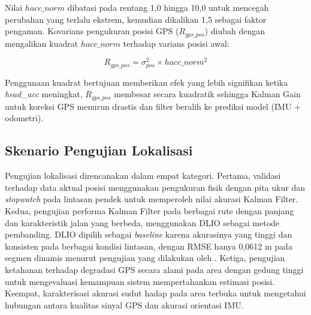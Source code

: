 Nilai $hacc\_norm$ dibatasi pada rentang 1,0 hingga 10,0 untuk mencegah perubahan yang terlalu ekstrem, kemudian dikalikan 1,5 sebagai faktor pengaman.
Kovarians pengukuran posisi GPS ($R_{gps\_pos}$) diubah dengan mengalikan kuadrat $hacc\_norm$ terhadap varians posisi awal:

\begin{equation}
R_{gps\_pos} = \sigma_{pos}^2 \times hacc\_norm^2
\label{eq:r_gps_adaptif}
\end{equation}

Penggunaan kuadrat bertujuan memberikan efek yang lebih signifikan ketika \emph{head\_acc} meningkat, $R_{gps\_pos}$ membesar secara kuadratik sehingga Kalman Gain untuk koreksi GPS menurun drastis dan filter beralih ke prediksi model (IMU + odometri).

\subsection{Skenario Pengujian Lokalisasi}

Pengujian lokalisasi direncanakan dalam empat kategori.
Pertama, validasi terhadap data aktual posisi menggunakan pengukuran fisik dengan pita ukur dan \emph{stopwatch} pada lintasan pendek untuk memperoleh nilai akurasi Kalman Filter.
Kedua, pengujian performa Kalman Filter pada berbagai rute dengan panjang dan karakteristik jalan yang berbeda, menggunakan DLIO sebagai metode pembanding. DLIO dipilih sebagai \emph{baseline} karena akurasinya yang tinggi dan konsisten pada berbagai kondisi lintasan, dengan RMSE hanya 0,0612 m pada segmen dinamis menurut pengujian yang dilakukan oleh \textcite{Chen2023DLIO}.
Ketiga, pengujian ketahanan terhadap degradasi GPS secara alami pada area dengan gedung tinggi untuk mengevaluasi kemampuan sistem mempertahankan estimasi posisi.
Keempat, karakterisasi akurasi sudut hadap pada area terbuka untuk mengetahui hubungan antara kualitas sinyal GPS dan akurasi orientasi IMU.

